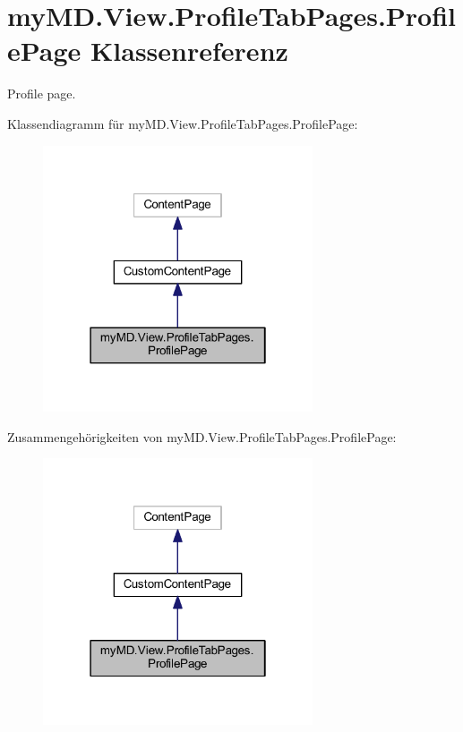 \hypertarget{classmy_m_d_1_1_view_1_1_profile_tab_pages_1_1_profile_page}{}\section{my\+M\+D.\+View.\+Profile\+Tab\+Pages.\+Profile\+Page Klassenreferenz}
\label{classmy_m_d_1_1_view_1_1_profile_tab_pages_1_1_profile_page}


Profile page.  




Klassendiagramm für my\+M\+D.\+View.\+Profile\+Tab\+Pages.\+Profile\+Page\+:\nopagebreak
\begin{figure}[H]
\begin{center}
\leavevmode
\includegraphics[width=226pt]{classmy_m_d_1_1_view_1_1_profile_tab_pages_1_1_profile_page__inherit__graph}
\end{center}
\end{figure}


Zusammengehörigkeiten von my\+M\+D.\+View.\+Profile\+Tab\+Pages.\+Profile\+Page\+:\nopagebreak
\begin{figure}[H]
\begin{center}
\leavevmode
\includegraphics[width=226pt]{classmy_m_d_1_1_view_1_1_profile_tab_pages_1_1_profile_page__coll__graph}
\end{center}
\end{figure}
